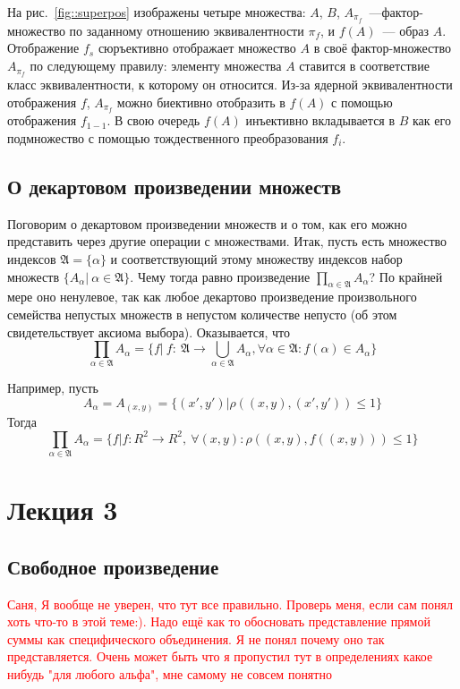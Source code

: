 \documentclass[a4paper, 12pt]{report}
\begin{document}
На рис.~\ref{fig::superpos} изображены четыре множества: $A$, $B$, $A_{\pi_f}$~---фактор-множество по заданному отношению эквивалентности $\pi_f$, и $f(A)$~--- образ  $A$. Отображение $f_s$ сюръективно отображает множество $A$ в своё фактор-множество $A_{\pi_f}$ по следующему правилу: элементу множества $A$ ставится в соответствие класс эквивалентности, к которому он относится. Из-за ядерной эквивалентности отображения $f$, $A_{\pi_f}$ можно биективно отобразить в $f(A)$ с помощью отображения $f_{1-1}$. В свою очередь $f(A)$ инъективно вкладывается в $B$ как его подмножество с помощью тождественного преобразования $f_i$.

\section{О декартовом произведении множеств}
Поговорим о декартовом произведении множеств и о том, как его можно представить через другие операции с множествами. Итак, пусть есть множество индексов $\mathfrak{A} = \{\alpha\}$ и соответствующий этому множеству индексов набор множеств $\{A_{\alpha}|\ \alpha \in \mathfrak{A}\}$. Чему тогда равно произведение $\prod_{\alpha \in \mathfrak{A}}A_{\alpha}$? По крайней мере оно ненулевое, так как любое декартово произведение произвольного семейства непустых множеств в непустом количестве непусто (об этом свидетельствует аксиома выбора). Оказывается, что
\[
\prod_{\alpha \in \mathfrak{A}}A_{\alpha} = \{f|\ f:\ \mathfrak{A}\rightarrow\bigcup_{\alpha \in \mathfrak{A}}A_{\alpha}, \forall\alpha\in\mathfrak{A}: f(\alpha)\in A_{\alpha}\}
\]

Например, пусть
\[
A_{\alpha} = A_{(x, y)} = \{(x', y')| \rho((x,y), (x',y')) \leq 1\}
\]
Тогда
\[
\prod_{\alpha \in \mathfrak{A}}A_{\alpha} = \{f| f: R^2 \rightarrow R^2,\ \forall (x,y): \rho((x,y), f((x,y))) \leq 1\}
\]

\chapter{Лекция 3}
\section{Свободное произведение}
\textcolor{red}{Саня, Я вообще не уверен, что тут все правильно. Проверь меня, если сам понял хоть что-то в этой теме:). Надо ещё как то обосновать представление прямой суммы как специфического объединения. Я не понял почему оно так представляется. Очень может быть что я пропустил тут в определениях какое нибудь "для любого альфа", мне самому не совсем понятно}
\end{document}
